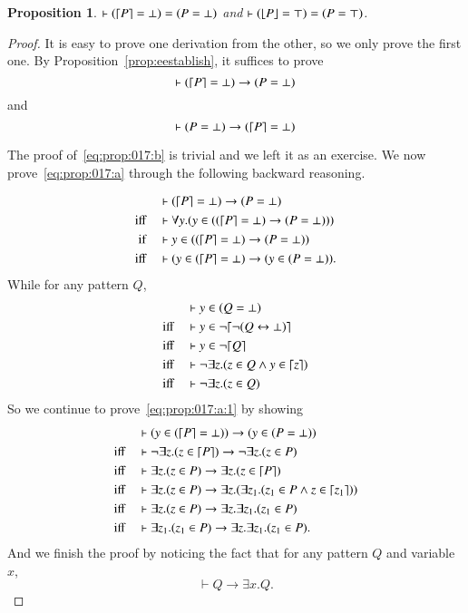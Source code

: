 \documentclass{article}
\theoremstyle{plain}
\newtheorem{prop}[thm]{Proposition}
\DeclarePairedDelimiter\ceil{\lceil}{\rceil}
\DeclarePairedDelimiter\floor{\lfloor}{\rfloor}
\begin{document}
\begin{prop} \label{prop:017}
	$\vdash (\ceil*{P} = \bot) = (P = \bot)$ and $\vdash (\floor*{P} = \top) = (P = \top)$.
\end{prop}
\begin{proof}
	It is easy to prove one derivation from the other, so we only prove the first one. By Proposition~\ref{prop:eestablish}, it suffices to prove
	\begin{equation} \label{eq:prop:017:a}
	\vdash (\ceil*{P} = \bot) \to (P = \bot)
	\end{equation}
	and
	\begin{equation} \label{eq:prop:017:b}
	\vdash (P = \bot) \to (\ceil*{P} = \bot)
	\end{equation}
	
	The proof of~\eqref{eq:prop:017:b} is trivial and we left it as an exercise. We now prove~\eqref{eq:prop:017:a} through the following backward reasoning.
	
	\begin{align}
	&\vdash (\ceil*{P} = \bot) \to (P = \bot)  \nonumber \\
	\text{iff} \quad &\vdash \forall y . (y \in ((\ceil*{P} = \bot) \to (P = \bot))) \nonumber \\
	\text{if} \quad &\vdash y \in ((\ceil*{P} = \bot) \to (P = \bot)) \nonumber \\
	\text{iff} \quad &\vdash (y \in (\ceil*{P} = \bot) \to (y \in (P = \bot)). \label{eq:prop:017:a:1}
	\end{align}
	While for any pattern $Q$, 
	\begin{align*}
	&\vdash y \in (Q = \bot) \\
	\text{iff} \quad &\vdash y \in \neg \ceil*{\neg (Q \leftrightarrow \bot)} \\
	\text{iff} \quad &\vdash y \in \neg \ceil*{Q}\\
	\text{iff} \quad &\vdash \neg \exists z . (z \in Q \wedge y \in \ceil*{z}) \\
	\text{iff} \quad &\vdash \neg \exists z . (z \in Q) 
	\end{align*}
	So we continue to prove~\eqref{eq:prop:017:a:1} by showing
	\begin{align*}
&\vdash (y \in (\ceil*{P} = \bot)) \to (y \in (P = \bot))  \\
\text{iff} \quad &\vdash \neg \exists z . (z \in \ceil*{P}) \to \neg \exists z . (z \in P) \\
\text{iff} \quad &\vdash \exists z . (z \in P) \to  \exists z . (z \in \ceil*{P}) \\
\text{iff} \quad &\vdash \exists z . (z \in P) \to \exists z . (\exists z_1 . (z_1 \in P \wedge z \in \ceil*{z_1}))\\
\text{iff} \quad &\vdash \exists z . (z \in P) \to \exists z . \exists z_1 . (z_1 \in P) \\
\text{iff} \quad &\vdash \exists z_1 . (z_1 \in P) \to \exists z . \exists z_1 . (z_1 \in P).
	\end{align*}
	And we finish the proof by noticing the fact that for any pattern $Q$ and variable $x$, 
	$$ \vdash Q \to \exists x . Q.$$
	
\end{proof}
\end{document}
